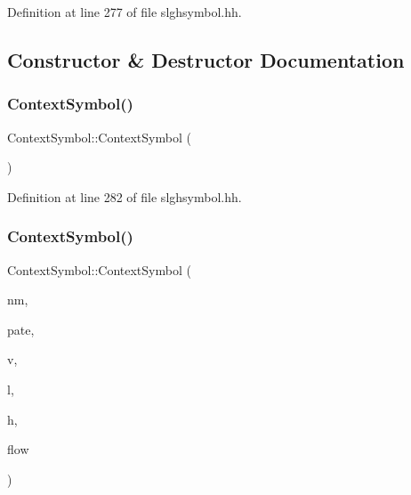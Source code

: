 Definition at line 277 of file slghsymbol.\+hh.



\subsection{Constructor \& Destructor Documentation}
\mbox{\label{class_context_symbol_aea7c56013fda3735d07d95347a6b17d4}} 
\subsubsection{\texorpdfstring{ContextSymbol()}{ContextSymbol()}\hspace{0.1cm}{\footnotesize\ttfamily [1/2]}}
{\footnotesize\ttfamily Context\+Symbol\+::\+Context\+Symbol (\begin{DoxyParamCaption}\item[{void}]{ }\end{DoxyParamCaption})\hspace{0.3cm}{\ttfamily [inline]}}



Definition at line 282 of file slghsymbol.\+hh.

\mbox{\label{class_context_symbol_a4cd97b7372ebfced19b138a3910c0a66}} 
\subsubsection{\texorpdfstring{ContextSymbol()}{ContextSymbol()}\hspace{0.1cm}{\footnotesize\ttfamily [2/2]}}
{\footnotesize\ttfamily Context\+Symbol\+::\+Context\+Symbol (\begin{DoxyParamCaption}\item[{const string \&}]{nm,  }\item[{\mbox{\hyperlink{class_context_field}{Context\+Field}} $\ast$}]{pate,  }\item[{\mbox{\hyperlink{class_varnode_symbol}{Varnode\+Symbol}} $\ast$}]{v,  }\item[{uint4}]{l,  }\item[{uint4}]{h,  }\item[{bool}]{flow }\end{DoxyParamCaption})}



